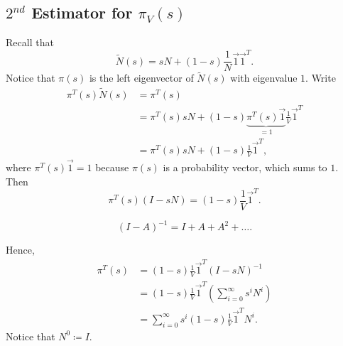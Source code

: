 \subsection{\(2^{nd}\) Estimator for \(\pi_V(s)\)}
Recall that
\[
	\widetilde{N}(s) = sN+(1-s)\frac{1}{N}\vec{1}\vec{1}^{T}.
\]
Notice that \(\pi(s)\) is the left eigenvector of \(\widetilde{N}(s)\) with eigenvalue \(1\). Write
\[
	\begin{split}
		\pi^{T}(s)\widetilde{N}(s) &= \pi^{T}(s) \\
		&= \pi^{T}(s)sN+(1 - s)\underbrace{\pi^{T}(s)\vec{1}}_{ = 1}\frac{1}{V}\vec{1}^{T}\\
		&= \pi^{T}(s)sN+(1 - s)\frac{1}{V}\vec{1}^{T},
	\end{split}
\]
where \(\pi^{T}(s)\vec{1} = 1\) because \(\pi(s)\) is a probability vector, which sums to \(1\). Then
\[
	\pi^{T}(s)(I - sN) = (1 - s)\frac{1}{V}\vec{1}^{T}.
\]
\begin{prev}
	\[
		(I - A)^{-1} = I + A + A^2 + \ldots .
	\]
\end{prev}
Hence,
\[
	\begin{split}
		\pi^{T}(s) &= (1 - s)\frac{1}{V}\vec{1}^{T}(I - sN)^{-1}\\
		&= (1 - s)\frac{1}{V}\vec{1}^{T}\left(\sum\limits_{i=0}^{\infty} s^i N^i\right)\\
		&= \sum\limits_{i=0}^{\infty} s^i (1 - s)\frac{1}{V}\vec{1}^{T}N^i.
	\end{split}
\]
Notice that \(N^0\coloneqq I\).

